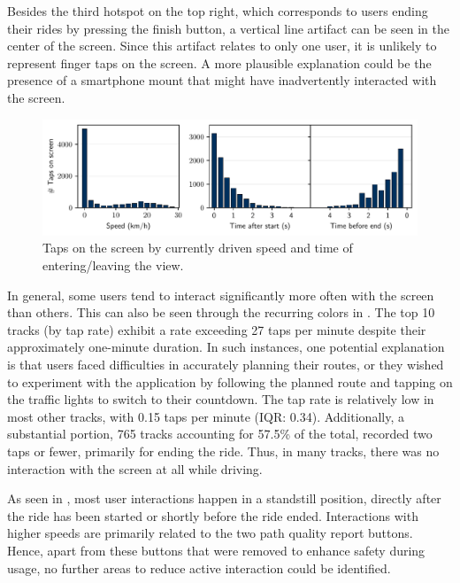 Besides the third hotspot on the top right, which corresponds to users ending their rides by pressing the finish button, a vertical line artifact can be seen in the center of the screen. Since this artifact relates to only one user, it is unlikely to represent finger taps on the screen. A more plausible explanation could be the presence of a smartphone mount that might have inadvertently interacted with the screen.

\begin{figure}[t]
\caption{Taps on the screen by currently driven speed and time of entering/leaving the view.}\label{fig:app-user-interaction-speed}
\includegraphics[width=\linewidth]{images/app-user-interaction-speed.pdf}
\end{figure}

In general, some users tend to interact significantly more often with the screen than others. This can also be seen through the recurring colors in . The top 10 tracks (by tap rate) exhibit a rate exceeding 27 taps per minute despite their approximately one-minute duration. In such instances, one potential explanation is that users faced difficulties in accurately planning their routes, or they wished to experiment with the application by following the planned route and tapping on the traffic lights to switch to their countdown. The tap rate is relatively low in most other tracks, with 0.15 taps per minute (IQR: 0.34). Additionally, a substantial portion, 765 tracks accounting for 57.5\% of the total, recorded two taps or fewer, primarily for ending the ride. Thus, in many tracks, there was no interaction with the screen at all while driving.

As seen in , most user interactions happen in a standstill position, directly after the ride has been started or shortly before the ride ended. Interactions with higher speeds are primarily related to the two path quality report buttons. Hence, apart from these buttons that were removed to enhance safety during usage, no further areas to reduce active interaction could be identified.

